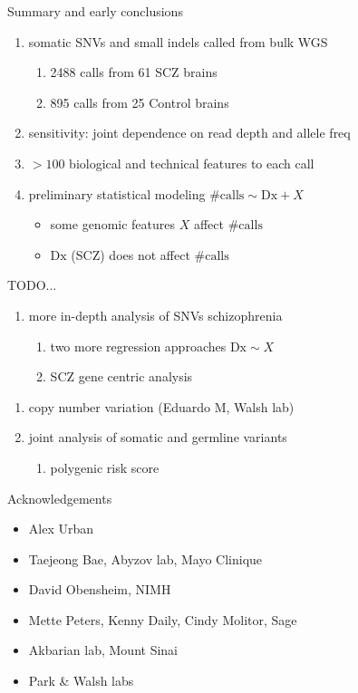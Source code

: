 \documentclass[usenames,dvipsnames]{beamer}
\begin{document}
\begin{frame}{Summary and early conclusions}
\begin{enumerate}
\item somatic SNVs and small indels called from bulk WGS 
\begin{enumerate}
\item 2488 calls from 61 SCZ brains
\item 895 calls from 25 Control brains
\end{enumerate}
\item sensitivity: joint dependence on read depth and allele freq
\item \(> 100\) biological and technical features to each call
\item preliminary statistical modeling \(\mathrm{\#calls} \sim \mathrm{Dx} + X\)
\begin{itemize}
\item some genomic features \(X\) affect \(\mathrm{\#calls}\)
\item \(\mathrm{Dx}\) (SCZ) does not affect \(\mathrm{\#calls}\)
\end{itemize}
\end{enumerate}
\end{frame}

\begin{frame}{TODO...}
\begin{enumerate}
\item more in-depth analysis of SNVs schizophrenia
\begin{enumerate}
\item two more regression approaches \(\mathrm{Dx} \sim X\)
\item SCZ gene centric analysis
\end{enumerate}
\end{enumerate}
\begin{enumerate}
\item copy number variation (Eduardo M, Walsh lab)
\item joint analysis of somatic and germline variants
\begin{enumerate}
\item polygenic risk score
\end{enumerate}
\end{enumerate}
\end{frame}

\begin{frame}{Acknowledgements}
\begin{itemize}
\item Alex Urban %
\item Taejeong Bae, Abyzov lab, Mayo Clinique
\item David Obensheim, NIMH
\item Mette Peters, Kenny Daily, Cindy Molitor, Sage
\item Akbarian lab, Mount Sinai %
\item Park \& Walsh labs %
\end{itemize}
\end{frame}
\end{document}
